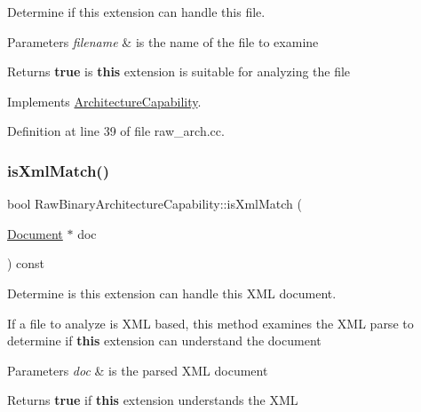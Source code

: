 Determine if this extension can handle this file. 


\begin{DoxyParams}{Parameters}
{\em filename} & is the name of the file to examine \\
\hline
\end{DoxyParams}
\begin{DoxyReturn}{Returns}
{\bfseries{true}} is {\bfseries{this}} extension is suitable for analyzing the file 
\end{DoxyReturn}


Implements \mbox{\hyperlink{class_architecture_capability_aa3d4fed15e42f3e853851babaf379376}{Architecture\+Capability}}.



Definition at line 39 of file raw\+\_\+arch.\+cc.

\mbox{\label{class_raw_binary_architecture_capability_ad26a1a35fec33c5952a3f499dc0e43db}} 
\subsubsection{\texorpdfstring{isXmlMatch()}{isXmlMatch()}}
{\footnotesize\ttfamily bool Raw\+Binary\+Architecture\+Capability\+::is\+Xml\+Match (\begin{DoxyParamCaption}\item[{\mbox{\hyperlink{class_document}{Document}} $\ast$}]{doc }\end{DoxyParamCaption}) const\hspace{0.3cm}{\ttfamily [virtual]}}



Determine is this extension can handle this X\+ML document. 

If a file to analyze is X\+ML based, this method examines the X\+ML parse to determine if {\bfseries{this}} extension can understand the document 
\begin{DoxyParams}{Parameters}
{\em doc} & is the parsed X\+ML document \\
\hline
\end{DoxyParams}
\begin{DoxyReturn}{Returns}
{\bfseries{true}} if {\bfseries{this}} extension understands the X\+ML 
\end{DoxyReturn}


